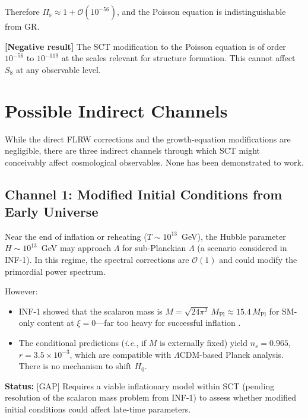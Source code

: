 \documentclass[11pt,a4paper]{article}
\theoremstyle{plain}
\theoremstyle{definition}
\theoremstyle{remark}
\newcommand{\ie}{\textit{i.e.}}
\newcommand{\gap}{\textcolor{red!80!black}{\textsf{[GAP]}}}
\newcommand{\negativeresult}[1]{%
  \par\smallskip\noindent
  \colorbox{orange!10}{\parbox{\dimexpr\linewidth-2\fboxsep}{%
    \textcolor{orange!60!black}{\textbf{[Negative result]}} #1}}%
  \par\smallskip}
\begin{document}
Therefore $\Pi_{\mathrm{s}} \approx 1 + \mathcal{O}(10^{-56})$, and the
Poisson equation is indistinguishable from GR.

\negativeresult{The SCT modification to the Poisson equation is of
order $10^{-56}$ to $10^{-119}$ at the scales relevant for structure
formation. This cannot affect $S_8$ at any observable level.}

\section{Possible Indirect Channels}
\label{sec:indirect}

While the direct FLRW corrections and the growth-equation modifications
are negligible, there are three indirect channels through which SCT
might conceivably affect cosmological observables. None has been
demonstrated to work.

\subsection{Channel 1: Modified Initial Conditions from Early Universe}

Near the end of inflation or reheating ($T \sim 10^{13}$~GeV), the
Hubble parameter $H \sim 10^{13}$~GeV may approach $\Lambda$ for
sub-Planckian $\Lambda$ (a scenario considered in INF-1). In this
regime, the spectral corrections are $\mathcal{O}(1)$ and could modify
the primordial power spectrum.

However:
\begin{itemize}[nosep]
  \item INF-1 showed that the scalaron mass is $M = \sqrt{24\pi^2}\,M_{\mathrm{Pl}}
    \approx 15.4\,M_{\mathrm{Pl}}$ for SM-only content at $\xi = 0$---far too heavy
    for successful inflation \cite{INF1}.
  \item The conditional predictions (\ie, if $M$ is externally fixed) yield
    $n_s = 0.965$, $r = 3.5 \times 10^{-3}$, which are compatible with
    $\Lambda$CDM-based Planck analysis. There is no mechanism to shift $H_0$.
\end{itemize}

\textbf{Status:} \gap{} Requires a viable inflationary model within SCT (pending
resolution of the scalaron mass problem from INF-1) to assess whether
modified initial conditions could affect late-time parameters.
\end{document}
